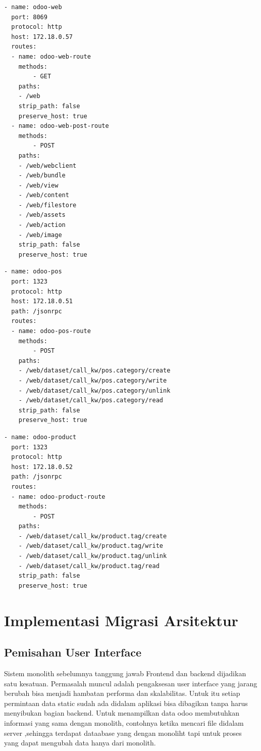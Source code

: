 \begin{lstlisting}[style=mystyle, language=sh, caption={Konfigurasi Service Web/Frontend }]
- name: odoo-web
  port: 8069
  protocol: http
  host: 172.18.0.57
  routes:
  - name: odoo-web-route
    methods:
        - GET
    paths:
    - /web
    strip_path: false
    preserve_host: true
  - name: odoo-web-post-route
    methods:
        - POST
    paths:
    - /web/webclient
    - /web/bundle
    - /web/view
    - /web/content
    - /web/filestore
    - /web/assets
    - /web/action
    - /web/image
    strip_path: false
    preserve_host: true  
\end{lstlisting} 

\begin{lstlisting}[style=mystyle, language=sh, caption={Konfigurasi Service Point of Sale }]
- name: odoo-pos
  port: 1323
  protocol: http
  host: 172.18.0.51
  path: /jsonrpc
  routes:
  - name: odoo-pos-route
    methods:
        - POST
    paths:
    - /web/dataset/call_kw/pos.category/create
    - /web/dataset/call_kw/pos.category/write
    - /web/dataset/call_kw/pos.category/unlink
    - /web/dataset/call_kw/pos.category/read
    strip_path: false
    preserve_host: true
\end{lstlisting} 

\begin{lstlisting}[style=mystyle, language=sh, caption={Konfigurasi Service Product }]
- name: odoo-product
  port: 1323
  protocol: http
  host: 172.18.0.52
  path: /jsonrpc
  routes:
  - name: odoo-product-route
    methods:
        - POST
    paths:
    - /web/dataset/call_kw/product.tag/create
    - /web/dataset/call_kw/product.tag/write
    - /web/dataset/call_kw/product.tag/unlink
    - /web/dataset/call_kw/product.tag/read
    strip_path: false
    preserve_host: true	
\end{lstlisting} 
	

\section{Implementasi Migrasi Arsitektur}
\subsection{Pemisahan User Interface}
Sistem monolith sebelumnya tanggung jawab Frontend dan backend dijadikan satu kesatuan. Permasalah muncul adalah pengaksesan user interface yang jarang berubah bisa menjadi hambatan performa dan skalabilitas. 
Untuk itu setiap permintaan data static sudah ada didalam aplikasi bisa dibagikan tanpa harus menyibukan bagian backend. Untuk menampilkan data odoo membutuhkan informasi yang sama dengan monolith, contohnya ketika mencari file didalam server ,sehingga terdapat dataabase yang dengan monoliht tapi untuk proses yang dapat mengubah data hanya dari monolith.

